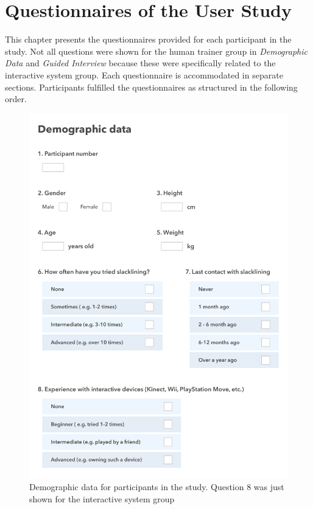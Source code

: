 \begin{appendices}

\label{app_questionnaire}
\chapter{Questionnaires of the User Study}
This chapter presents the questionnaires provided for each participant in the study.
Not all questions were shown for the human trainer group in \textit{Demographic Data} and \textit{Guided Interview} because these were specifically related to the interactive system group.
Each questionnaire is accommodated in separate sections.
Participants fulfilled the questionnaires as structured in the following order.

\clearpage
\begin{figure}[htb]
	\centering
	\begin{minipage}[t]{1\linewidth}
		\centering
		\includegraphics[width=1\linewidth]{Pictures/App_DemographicDataSystem}
		\caption{Demographic data for participants in the study. Question 8 was just shown for the interactive system group}
		\label{fig:App_DemographicDataHTG}
	\end{minipage}
\end{figure}


\end{appendices}
